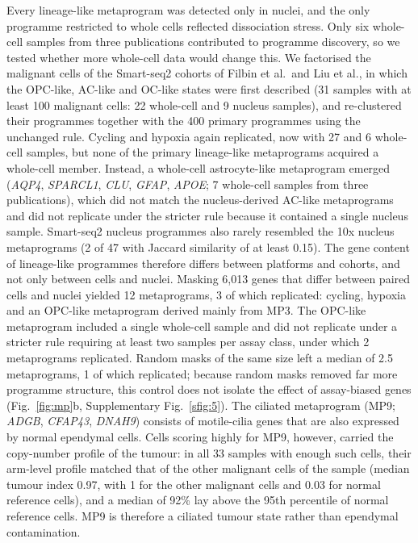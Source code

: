 \documentclass[11pt,a4paper]{article}
\begin{document}
Every lineage-like metaprogram was detected only in nuclei, and the only programme restricted to whole cells reflected
dissociation stress. Only six whole-cell samples from three publications contributed to programme discovery, so we
tested whether more whole-cell data would change this. We factorised the malignant cells of the Smart-seq2 cohorts of
Filbin et al.\ and Liu et al., in which the OPC-like, AC-like and OC-like states were first described (31 samples with at
least 100 malignant cells: 22 whole-cell and 9 nucleus samples), and re-clustered their programmes together with the 400
primary programmes using the unchanged rule. Cycling and hypoxia again replicated, now with 27 and 6 whole-cell samples,
but none of the primary lineage-like metaprograms acquired a whole-cell member. Instead, a whole-cell astrocyte-like
metaprogram emerged (\textit{AQP4}, \textit{SPARCL1}, \textit{CLU}, \textit{GFAP}, \textit{APOE}; 7 whole-cell samples
from three publications), which did not match the nucleus-derived AC-like metaprograms and did not replicate under the
stricter rule because it contained a single nucleus sample. Smart-seq2 nucleus programmes also rarely resembled the 10x
nucleus metaprograms (2 of 47 with Jaccard similarity of at least 0.15). The gene content of lineage-like programmes
therefore differs between platforms and cohorts, and not only between cells and nuclei. Masking 6,013 genes that differ between paired cells and nuclei yielded 12
metaprograms, 3 of which replicated: cycling, hypoxia and an OPC-like metaprogram derived mainly from MP3. The OPC-like
metaprogram included a single whole-cell sample and did not replicate under a stricter rule requiring at least two samples
per assay class, under which 2 metaprograms replicated. Random masks of the same size left a median of 2.5 metaprograms,
1 of which replicated; because random masks removed far more programme structure, this control does not isolate the
effect of assay-biased genes (Fig.~\ref{fig:mp}b, Supplementary Fig.~\ref{sfig:5}). The ciliated metaprogram (MP9; \textit{ADGB},
\textit{CFAP43}, \textit{DNAH9}) consists of motile-cilia genes that are also expressed by normal ependymal cells. Cells
scoring highly for MP9, however, carried the copy-number profile of the tumour: in all 33 samples with enough such cells,
their arm-level profile matched that of the other malignant cells of the sample (median tumour index 0.97, with 1 for the
other malignant cells and 0.03 for normal reference cells), and a median of 92\% lay above the 95th percentile of normal
reference cells. MP9 is therefore a ciliated tumour state rather than ependymal contamination.
\end{document}
